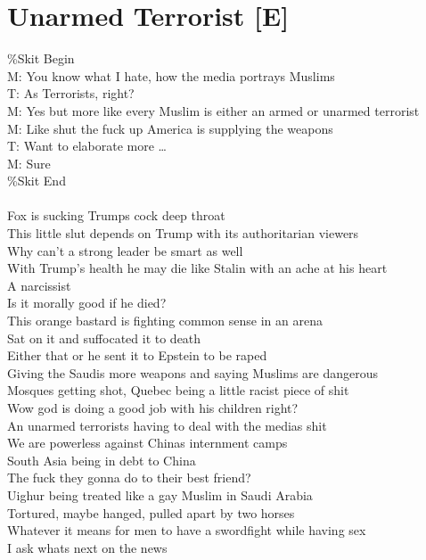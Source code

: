 \documentclass[12pt, b5paper, oneside]{book}
\begin{document}
\section{Unarmed Terrorist [E]}
\%Skit Begin
\\M: You know what I hate, how the media portrays Muslims
\\T: As Terrorists, right?
\\M: Yes but more like every Muslim is either an armed or unarmed terrorist
\\M: Like shut the fuck up America is supplying the weapons
\\T: Want to elaborate more \dots 
\\M: Sure
\\\%Skit End
%
\\\\Fox is sucking Trumps cock deep throat
\\This little slut depends on Trump with its authoritarian viewers
\\Why can't a strong leader be smart as well
\\With Trump's health he may die like Stalin with an ache at his heart
\\A narcissist
\\Is it morally good if he died?
\\This orange bastard is fighting common sense in an arena
\\Sat on it and suffocated it to death
\\Either that or he sent it to Epstein to be raped
\\Giving the Saudis more weapons and saying Muslims are dangerous
\\Mosques getting shot, Quebec being a little racist piece of shit
\\Wow god is doing a good job with his children right?
\\An unarmed terrorists having to deal with the medias shit
\\We are powerless against Chinas internment camps
\\South Asia being in debt to China
\\The fuck they gonna do to their best friend?
\\Uighur being treated like a gay Muslim in Saudi Arabia
\\Tortured, maybe hanged, pulled apart by two horses
\\Whatever it means for men to have a swordfight while having sex
\\I ask whats next on the news
\end{document}
